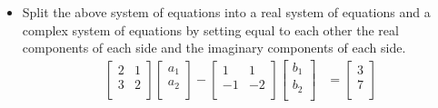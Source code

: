 \documentclass{article}
\begin{document}
\begin{itemize}
\begin{equation*}
\begin{bmatrix}
                1 & 1\\
                -1 & -2\\
            \end{bmatrix}
            \begin{bmatrix}
                a_1\\
                a_2\\
            \end{bmatrix}
        \right) =
        \begin{bmatrix}
            3\\
            7\\
        \end{bmatrix}
        +i
        \begin{bmatrix}
            6\\
            -1\\
        \end{bmatrix}
    \end{equation*}
    \item Split the above system of equations into a real system of equations and a complex system of equations by setting equal to each other the real components of each side and the imaginary components of each side.
    \begin{align*}
        \begin{bmatrix}
            2 & 1\\
            3 & 2\\
        \end{bmatrix}
        \begin{bmatrix}
            a_1\\
            a_2\\
        \end{bmatrix}
        -
        \begin{bmatrix}
            1 & 1\\
            -1 & -2\\
        \end{bmatrix}
        \begin{bmatrix}
            b_1\\
            b_2\\
        \end{bmatrix}
        &=
        \begin{bmatrix}
            3\\
            7\\
        \end{bmatrix}\\

\end{align*}
\end{itemize}
\end{document}
